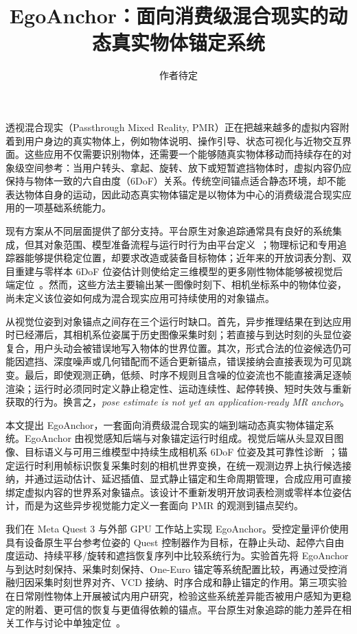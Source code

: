 \documentclass[review]{vgtc}
\title{EgoAnchor：面向消费级混合现实的动态真实物体锚定系统}
\author{作者待定}
\begin{document}
\label{sec:introduction}
\maketitle

透视混合现实（Passthrough Mixed Reality, PMR）正在把越来越多的虚拟内容附着到用户身边的真实物体上，例如物体说明、操作引导、状态可视化与近物交互界面。这些应用不仅需要识别物体，还需要一个能够随真实物体移动而持续存在的对象级空间参考：当用户转头、拿起、旋转、放下或短暂遮挡物体时，虚拟内容仍应保持与物体一致的六自由度（6DoF）关系。传统空间锚点适合静态环境，却不能表达物体自身的运动，因此动态真实物体锚定是以物体为中心的消费级混合现实应用的一项基础系统能力。

现有方案从不同层面提供了部分支持。平台原生对象追踪通常具有良好的系统集成，但其对象范围、模型准备流程与运行时行为由平台定义~\cite{appleObjectAnchor,azureObjectAnchors,vuforiaModelTargets,metaDynamicObjectTracker}；物理标记和专用追踪器能够提供稳定位置，却要求改造或装备目标物体；近年来的开放词表分割、双目重建与零样本 6DoF 位姿估计则使给定三维模型的更多刚性物体能够被视觉后端定位~\cite{posecnn2017,densefusion2019,cosypose2020,megapose2022,foundationpose2023}。然而，这些方法主要输出某一图像时刻下、相机坐标系中的物体位姿，尚未定义该位姿如何成为混合现实应用可持续使用的对象锚点。

从视觉位姿到对象锚点之间存在三个运行时缺口。首先，异步推理结果在到达应用时已经滞后，其相机系位姿属于历史图像采集时刻；若直接与到达时刻的头显位姿复合，用户头动会被错误地写入物体的世界位置。其次，形式合法的位姿候选仍可能因遮挡、深度噪声或几何错配而不适合更新锚点，错误接纳会直接表现为可见跳变。最后，即使观测正确，低频、时序不规则且含噪的位姿流也不能直接满足逐帧渲染；运行时必须同时定义静止稳定性、运动连续性、起停转换、短时失效与重新获取的行为。换言之，\emph{pose estimate is not yet an application-ready MR anchor}。

本文提出 EgoAnchor，一套面向消费级混合现实的端到端动态真实物体锚定系统。EgoAnchor 由视觉感知后端与对象锚定运行时组成。视觉后端从头显双目图像、目标语义与可用三维模型中持续生成相机系 6DoF 位姿及其可靠性诊断~\cite{yoloe2025,cutie2024,foundationstereo2025,foundationpose2023}；锚定运行时利用帧标识恢复采集时刻的相机世界变换，在统一观测边界上执行候选接纳，并通过运动估计、延迟插值、显式静止锚定和生命周期管理，合成应用可直接绑定虚拟内容的世界系对象锚点。该设计不重新发明开放词表检测或零样本位姿估计，而是为这些异步视觉能力定义一套面向 PMR 的观测到锚点契约。

我们在 Meta Quest 3 与外部 GPU 工作站上实现 EgoAnchor。受控定量评价使用具有设备原生平台参考位姿的 Quest 控制器作为目标，在静止头动、起停六自由度运动、持续平移/旋转和遮挡恢复序列中比较系统行为。实验首先将 EgoAnchor 与到达时刻保持、采集时刻保持、One-Euro 锚定等系统配置比较，再通过受控消融归因采集时刻世界对齐、VCD 接纳、时序合成和静止锚定的作用。第三项实验在日常刚性物体上开展被试内用户研究，检验这些系统差异能否被用户感知为更稳定的附着、更可信的恢复与更值得依赖的锚点。平台原生对象追踪的能力差异在相关工作与讨论中单独定位~\cite{appleObjectAnchor,azureObjectAnchors,metaDynamicObjectTracker}。
\end{document}
